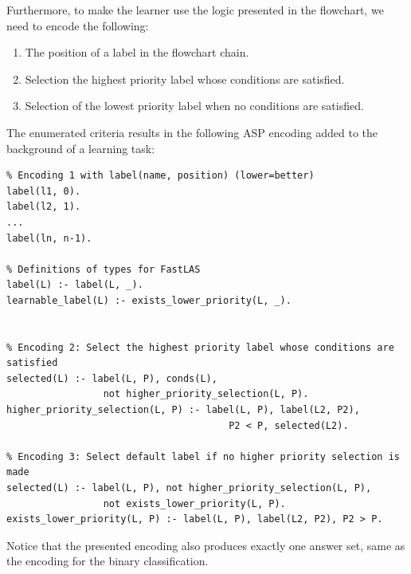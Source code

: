 Furthermore, to make the learner use the logic presented in the flowchart, we need to encode the following: 
\begin{enumerate}
    \item The position of a label in the flowchart chain.
    \item Selection the highest priority label whose conditions are satisfied.
    \item Selection of the lowest priority label when no conditions are satisfied.
\end{enumerate}
The enumerated criteria results in the following ASP encoding added to the background of a learning task:
\begin{lstlisting}
% Encoding 1 with label(name, position) (lower=better)
label(l1, 0).
label(l2, 1).
...
label(ln, n-1).

% Definitions of types for FastLAS
label(L) :- label(L, _).
learnable_label(L) :- exists_lower_priority(L, _).


% Encoding 2: Select the highest priority label whose conditions are satisfied
selected(L) :- label(L, P), conds(L), 
                 not higher_priority_selection(L, P).
higher_priority_selection(L, P) :- label(L, P), label(L2, P2), 
                                       P2 < P, selected(L2).

% Encoding 3: Select default label if no higher priority selection is made
selected(L) :- label(L, P), not higher_priority_selection(L, P), 
                 not exists_lower_priority(L, P).
exists_lower_priority(L, P) :- label(L, P), label(L2, P2), P2 > P.
\end{lstlisting}

Notice that the presented encoding also produces exactly one answer set, same as the encoding for the binary classification.

